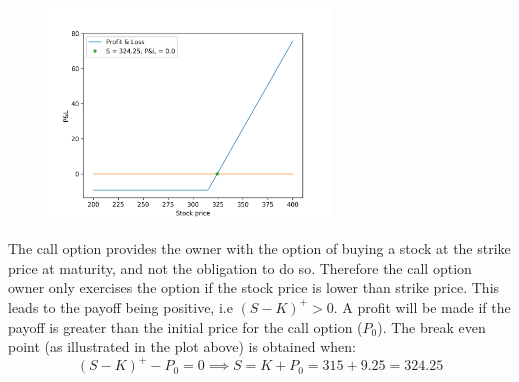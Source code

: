\documentclass{article}
\begin{document}
\begin{figure}[H]
	\centering
	\includegraphics[width=75mm]{pl.png}
\end{figure}
The call option provides the owner with the option of buying a stock at the strike price at maturity, and not the obligation to do so. Therefore the call option owner only exercises the option if the stock price is lower than strike price. This leads to the payoff being positive, i.e $(S-K)^+ > 0$. A profit will be made if the payoff is greater than the initial price for the call option ($P_0$). The break even point (as illustrated in the plot above) is obtained when: 
$$(S-K)^+ - P_0 = 0 \implies S = K + P_0 = 315 + 9.25 = 324.25$$

\section{}
\end{document}
